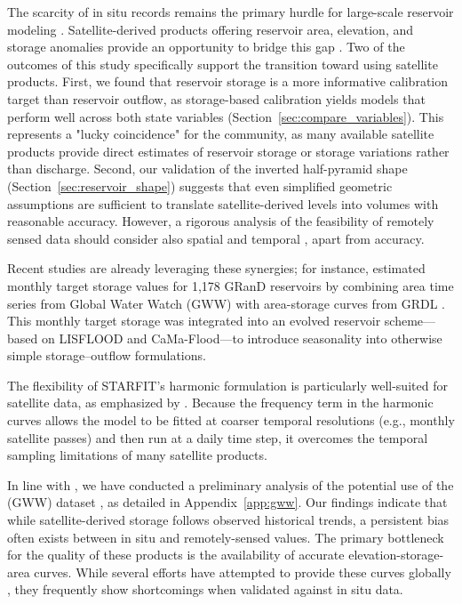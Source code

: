 \documentclass[hess, manuscript]{copernicus}
\begin{document}
The scarcity of in situ records remains the primary hurdle for large-scale reservoir modeling \citep{Shen2025}. Satellite-derived products offering reservoir area, elevation, and storage anomalies provide an opportunity to bridge this gap \citep{Zhao2018, Schwatke2020, Donchyts2022, Khandelwal2022, Hao2024, Hou2024}. Two of the outcomes of this study specifically support the transition toward using satellite products. First, we found that reservoir storage is a more informative calibration target than reservoir outflow, as storage-based calibration yields models that perform well across both state variables (Section~\ref{sec:compare_variables}). This represents a "lucky coincidence" for the community, as many available satellite products provide direct estimates of reservoir storage or storage variations rather than discharge. Second, our validation of the inverted half-pyramid shape (Section~\ref{sec:reservoir_shape}) suggests that even simplified geometric assumptions are sufficient to translate satellite-derived levels into volumes with reasonable accuracy. However, a rigorous analysis of the feasibility of remotely sensed data should consider also spatial and temporal , apart from accuracy.

Recent studies are already leveraging these synergies; for instance, \citet{Shen2025} estimated monthly target storage values for 1,178 GRanD reservoirs by combining area time series from Global Water Watch (GWW) \citep{Donchyts2022} with area-storage curves from GRDL \citep{Hao2024}. This monthly target storage was integrated into an evolved reservoir scheme—based on LISFLOOD and CaMa-Flood—to introduce seasonality into otherwise simple storage--outflow formulations. 

The flexibility of STARFIT’s harmonic formulation is particularly well-suited for satellite data, as emphasized by \citet{Steyaert2025}. Because the frequency term in the harmonic curves allows the model to be fitted at coarser temporal resolutions (e.g., monthly satellite passes) and then run at a daily time step, it overcomes the temporal sampling limitations of many satellite products.

In line with \citet{Shen2025}, we have conducted a preliminary analysis of the potential use of the (GWW) dataset \citep{Donchyts2022}, as detailed in Appendix~\ref{app:gww}. Our findings indicate that while satellite-derived storage follows observed historical trends, a persistent bias often exists between in situ and remotely-sensed values. The primary bottleneck for the quality of these products is the availability of accurate elevation-storage-area curves. While several efforts have attempted to provide these curves globally \citep{Yigzaw2018, Busker2019, Khazaei2022}, they frequently show shortcomings when validated against in situ data.
\end{document}
